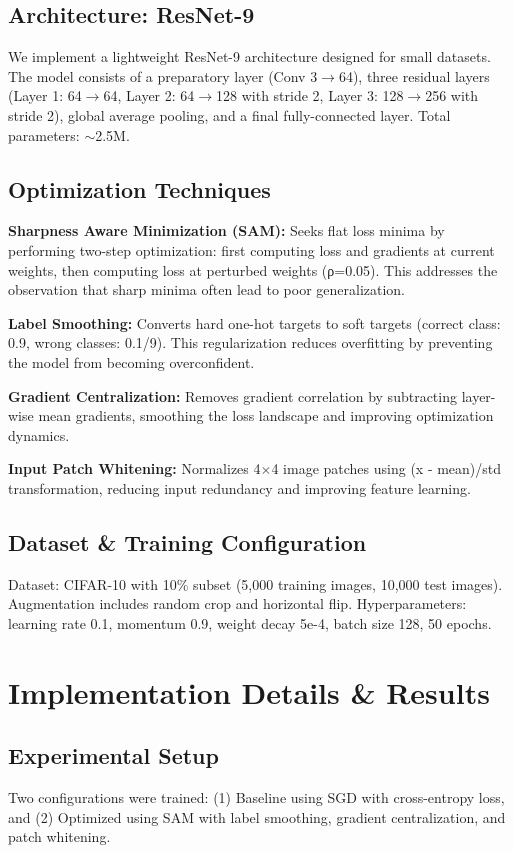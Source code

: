 \documentclass[11pt,a4paper]{article}
\begin{document}
\subsection{Architecture: ResNet-9}
We implement a lightweight ResNet-9 architecture designed for small datasets. The model consists of a preparatory layer (Conv 3$\rightarrow$64), three residual layers (Layer 1: 64$\rightarrow$64, Layer 2: 64$\rightarrow$128 with stride 2, Layer 3: 128$\rightarrow$256 with stride 2), global average pooling, and a final fully-connected layer. Total parameters: $\sim$2.5M.

\subsection{Optimization Techniques}

\textbf{Sharpness Aware Minimization (SAM):} Seeks flat loss minima by performing two-step optimization: first computing loss and gradients at current weights, then computing loss at perturbed weights (ρ=0.05). This addresses the observation that sharp minima often lead to poor generalization.

\textbf{Label Smoothing:} Converts hard one-hot targets to soft targets (correct class: 0.9, wrong classes: 0.1/9). This regularization reduces overfitting by preventing the model from becoming overconfident.

\textbf{Gradient Centralization:} Removes gradient correlation by subtracting layer-wise mean gradients, smoothing the loss landscape and improving optimization dynamics.

\textbf{Input Patch Whitening:} Normalizes 4$\times$4 image patches using (x - mean)/std transformation, reducing input redundancy and improving feature learning.

\subsection{Dataset \& Training Configuration}
Dataset: CIFAR-10 with 10\% subset (5,000 training images, 10,000 test images). Augmentation includes random crop and horizontal flip. Hyperparameters: learning rate 0.1, momentum 0.9, weight decay 5e-4, batch size 128, 50 epochs.

\section{Implementation Details \& Results}

\subsection{Experimental Setup}
Two configurations were trained: (1) Baseline using SGD with cross-entropy loss, and (2) Optimized using SAM with label smoothing, gradient centralization, and patch whitening.
\end{document}
